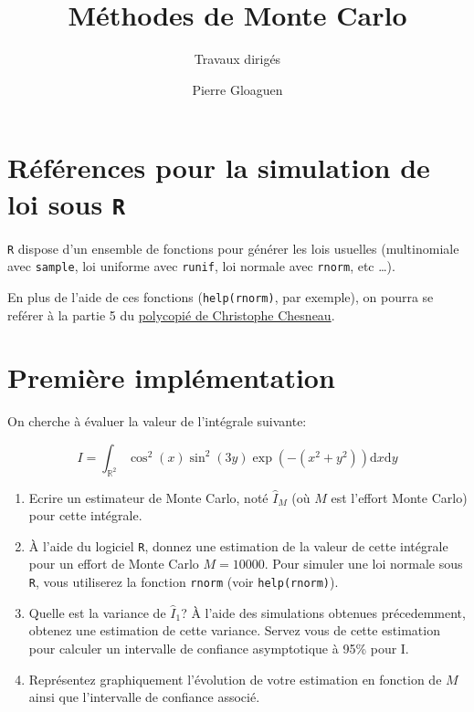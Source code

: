 \documentclass[]{article}
\title{Méthodes de Monte Carlo}
\subtitle{Travaux dirigés}
\author{Pierre Gloaguen}
\date{}
\begin{document}
\maketitle

{
\setcounter{tocdepth}{3}
\tableofcontents
}
\hypertarget{ruxe9fuxe9rences-pour-la-simulation-de-loi-sous-r}{%
\section*{\texorpdfstring{Références pour la simulation de loi sous
\texttt{R}}{Références pour la simulation de loi sous R}}\label{ruxe9fuxe9rences-pour-la-simulation-de-loi-sous-r}}

\texttt{R} dispose d'un ensemble de fonctions pour générer les lois
usuelles (multinomiale avec \texttt{sample}, loi uniforme avec
\texttt{runif}, loi normale avec \texttt{rnorm}, etc \dots).

En plus de l'aide de ces fonctions (\texttt{help(rnorm)}, par exemple),
on pourra se reférer à la partie 5 du
\href{https://cel.archives-ouvertes.fr/cel-01389942/document}{polycopié
de Christophe Chesneau}.

\hypertarget{premiuxe8re-impluxe9mentation}{%
\section{Première implémentation}\label{premiuxe8re-impluxe9mentation}}

On cherche à évaluer la valeur de l'intégrale suivante:

\[I = \int_{\mathbb{R}^2}\cos^2(x)  \sin^2(3 y)  \exp(-(x^2 + y^2))\text{d}x\text{d}y\]

\begin{enumerate}
\def\labelenumi{\arabic{enumi}.}
\item
  Ecrire un estimateur de Monte Carlo, noté \(\hat{I}_M\) (où \(M\) est
  l'effort Monte Carlo) pour cette intégrale.
\item
  À l'aide du logiciel \texttt{R}, donnez une estimation de la valeur de
  cette intégrale pour un effort de Monte Carlo \(M = 10000\). Pour
  simuler une loi normale sous \texttt{R}, vous utiliserez la fonction
  \texttt{rnorm} (voir \texttt{help(rnorm)}).
\item
  Quelle est la variance de \(\hat{I}_1\)? À l'aide des simulations
  obtenues précedemment, obtenez une estimation de cette variance.
  Servez vous de cette estimation pour calculer un intervalle de
  confiance asymptotique à 95\% pour I.
\item
  Représentez graphiquement l'évolution de votre estimation en fonction
  de \(M\) ainsi que l'intervalle de confiance associé.
\end{enumerate}
\end{document}

